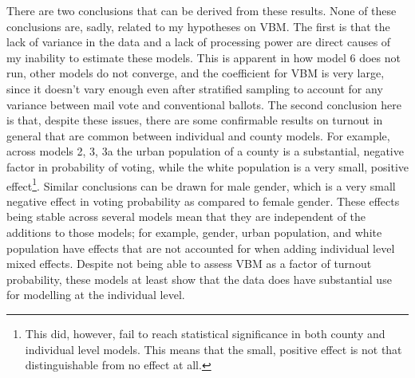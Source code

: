\documentclass[]{article}
\let\rmarkdownfootnote\footnote%
\def\footnote{\protect\rmarkdownfootnote}
\begin{document}
There are two conclusions that can be derived from these results. None
of these conclusions are, sadly, related to my hypotheses on VBM. The
first is that the lack of variance in the data and a lack of processing
power are direct causes of my inability to estimate these models. This
is apparent in how model 6 does not run, other models do not converge,
and the coefficient for VBM is very large, since it doesn't vary enough
even after stratified sampling to account for any variance between mail
vote and conventional ballots. The second conclusion here is that,
despite these issues, there are some confirmable results on turnout in
general that are common between individual and county models. For
example, across models 2, 3, 3a the urban population of a county is a
substantial, negative factor in probability of voting, while the white
population is a very small, positive effect\footnote{This did, however,
  fail to reach statistical significance in both county and individual
  level models. This means that the small, positive effect is not that
  distinguishable from no effect at all.}. Similar conclusions can be
drawn for male gender, which is a very small negative effect in voting
probability as compared to female gender. These effects being stable
across several models mean that they are independent of the additions to
those models; for example, gender, urban population, and white
population have effects that are not accounted for when adding
individual level mixed effects. Despite not being able to assess VBM as
a factor of turnout probability, these models at least show that the
data does have substantial use for modelling at the individual level.
\end{document}
